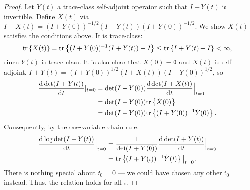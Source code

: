 \documentclass[review,supplement,hidelinks,onefignum,onetabnum]{siamart220329}
\begin{document}
\begin{proof}
  Let $Y(t)$ a trace-class self-adjoint operator such that 
  $I+Y(t)$ is invertible.
  Define $X(t)$ via $I+X(t) = (I+Y(0))^{-1/2} (I+Y(t)) (I+Y(0))^{-1/2}$. 
  We show $X(t)$ satisfies the conditions above. It is trace-class:
  \begin{align*}
    \textup{tr}\left \{X(t) \right \} = \textup{tr}\left \{(I+Y(0))^{-1} (I+Y(t)) - I \right \}
    \leq \textup{tr}\left \{I+Y(t) - I \right \}< \infty,
  \end{align*}
  since $Y(t)$ is trace-class. It is also clear that
  $X(0) = 0$ and $X(t)$ is self-adjoint.
  $I+Y(t) = (I+Y(0))^{1/2}(I+X(t))(I+Y(0))^{1/2}$, so
  \begin{align*}
    \frac{\text{\textup{d}} \det (I+Y(t))}{\text{\textup{d}} t}|_{t=0} 
    &= \det (I+Y(0))\frac{\text{\textup{d}} \det (I+X(t))}{\text{\textup{d}} t}\Big |_{t=0} \\
    &= \det (I+Y(0)) \textup{tr}\left \{\dot{X}(0) \right \} \\
    &= \det (I+Y(0)) \textup{tr}\left \{(I+Y(0))^{-1} \dot{Y}(0) \right \}.
  \end{align*}
  Consequently, by the one-variable chain rule:
  \begin{align*}
    \frac{\text{\textup{d}} \log \det (I+Y(t))}{\text{\textup{d}} t}\Big |_{t=0} &=
    \frac{1}{\det (I+Y(0))}\frac{\text{\textup{d}} \det (I+Y(t))}{\text{\textup{d}} t}\Big |_{t=0} \\ 
    &= \textup{tr}\left \{ (I+Y(t))^{-1} \dot{Y}(t) \right \} \big |_{t=0}.
  \end{align*}
  There is nothing special about $t_0 = 0$ --- we could have chosen
  any other $t_0$ instead. Thus, the relation holds for all $t$.
\end{proof}
\end{document}
